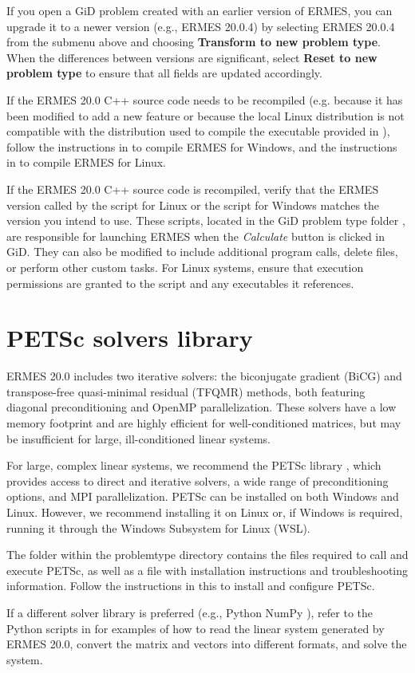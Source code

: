 If you open a GiD problem created with an earlier version of ERMES, you can upgrade it to a newer version (e.g., ERMES 20.0.4) by selecting ERMES 20.0.4 from the submenu above and choosing \textbf{Transform to new problem type}. When the differences between versions are significant, select \textbf{Reset to new problem type} to ensure that all fields are updated accordingly.

If the ERMES 20.0 C++ source code needs to be recompiled (e.g. because it has been modified to add a new feature or because the local Linux distribution is not compatible with the distribution used to compile the executable provided in ), follow the instructions in  to compile ERMES for Windows, and the instructions in  to compile ERMES for Linux.

If the ERMES 20.0 C++ source code is recompiled, verify that the ERMES version called by the  script for Linux or the  script for Windows matches the version you intend to use. These scripts, located in the GiD problem type folder , are responsible for launching ERMES when the \textit{Calculate} button is clicked in GiD. They can also be modified to include additional program calls, delete files, or perform other custom tasks. For Linux systems, ensure that execution permissions are granted to the script  and any executables it references. 

\section{PETSc solvers library}\label{ExternalSolversInstall}

ERMES 20.0 includes two iterative solvers: the biconjugate gradient (BiCG) and transpose-free quasi-minimal residual (TFQMR) methods, both featuring diagonal preconditioning and OpenMP parallelization. These solvers have a low memory footprint and are highly efficient for well-conditioned matrices, but may be insufficient for large, ill-conditioned linear systems.

For large, complex linear systems, we recommend the PETSc library \cite{PETScWeb}, which provides access to direct and iterative solvers, a wide range of preconditioning options, and MPI parallelization. PETSc can be installed on both Windows and Linux. However, we recommend installing it on Linux or, if Windows is required, running it through the Windows Subsystem for Linux (WSL).

The folder  within the problemtype directory contains the files required to call and execute PETSc, as well as a  file with installation instructions and troubleshooting information. Follow the instructions in this  to install and configure PETSc.

If a different solver library is preferred (e.g., Python NumPy \cite{NumPyWeb}), refer to the Python scripts in  for examples of how to read the linear system generated by ERMES 20.0, convert the matrix and vectors into different formats, and solve the system.